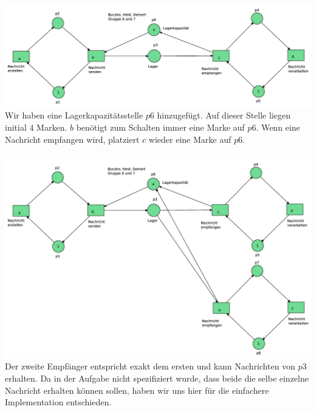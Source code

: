 \documentclass[a4paper,12pt]{scrartcl}
\begin{document}
\subsubsection{}
\includegraphics[scale=0.4]{6_4_2.png}
\\
Wir haben eine Lagerkapazitätsstelle $p6$ hinzugefügt. 
Auf dieser Stelle liegen initial 4 Marken. $b$ benötigt zum Schalten 
immer eine Marke auf $p6$. Wenn eine Nachricht empfangen wird, 
platziert $c$ wieder eine Marke auf $p6$.

\subsubsection{}
\includegraphics[scale=0.4]{6_4_3.png}
\\
Der zweite Empfänger entspricht exakt dem ersten und kann Nachrichten von $p3$ erhalten. Da in der Aufgabe nicht spezifiziert wurde, dass beide die selbe einzelne Nachricht erhalten können sollen, haben wir uns hier für die einfachere Implementation entschieden. 

\end{document}
